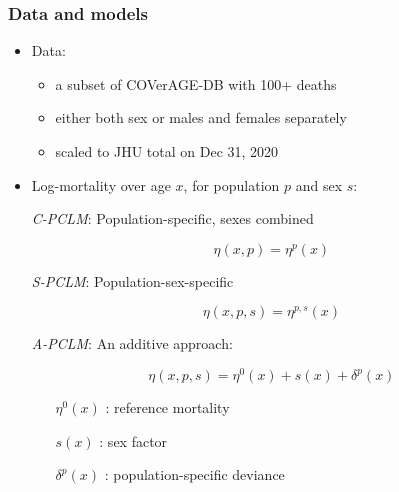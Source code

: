 \documentclass[table,xcdraw,dvipsnames]{beamer}
\begin{document}
\begin{frame}[fragile]\frametitle{Data and models}
	\vspace{-0.2cm}
\begin{itemize}
	\item Data:
	\begin{itemize}
		\item a subset of COVerAGE-DB with 100+ deaths
		\item either both sex or males and females separately
		\item scaled to JHU total on Dec 31, 2020
	\end{itemize}
\medskip
	\item Log-mortality over age $x$, for population $p$ and sex $s$:
	\medskip
	
	{\color{Red}\textsl{C-PCLM}}: Population-specific, sexes combined
	\begin{footnotesize}
	$$\eta(x,p) = \eta^{p}(x)$$
	\end{footnotesize}

	{\color{Blue}\textsl{S-PCLM}}: Population-sex-specific 
	\begin{footnotesize}
	$$\eta(x,p,s) = \eta^{p,s}(x)$$
	\end{footnotesize}

{\color{Green}\textsl{A-PCLM}}: An additive approach:
\begin{footnotesize}
$$
\eta(x,p,s) = \eta^{0}(x) + s(x) + \delta^{p}(x)
$$
\vspace{-0.5cm}
\begin{itemize}
	\item[$\eta^{0}(x)$]: reference mortality
	\item[$s(x)$]: sex factor
	\item[$\delta^{p}(x)$]: population-specific deviance
\end{itemize}
\end{footnotesize}
\end{itemize}
	
\end{frame}
\end{document}

